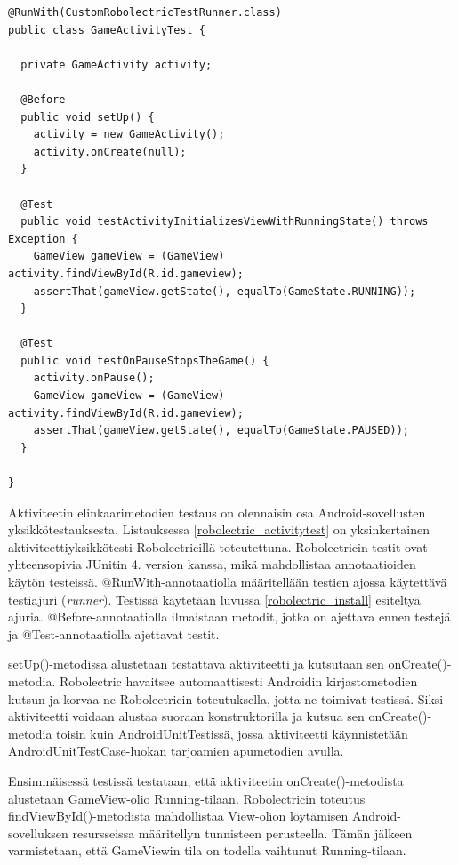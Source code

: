 \begin{lstlisting}[float,label=robolectric_activitytest,caption=Yksinkertainen aktiviteettiyksikkötesti Robolectricilla]
@RunWith(CustomRobolectricTestRunner.class)
public class GameActivityTest {

  private GameActivity activity;

  @Before
  public void setUp() {
    activity = new GameActivity();
    activity.onCreate(null);
  }

  @Test
  public void testActivityInitializesViewWithRunningState() throws Exception {
    GameView gameView = (GameView) activity.findViewById(R.id.gameview);
    assertThat(gameView.getState(), equalTo(GameState.RUNNING));
  }
  
  @Test
  public void testOnPauseStopsTheGame() {
  	activity.onPause();
  	GameView gameView = (GameView) activity.findViewById(R.id.gameview);
  	assertThat(gameView.getState(), equalTo(GameState.PAUSED));
  }
  
}
\end{lstlisting}

Aktiviteetin elinkaarimetodien testaus on olennaisin osa Android-sovellusten yksikkötestauksesta. Listauksessa \ref{robolectric_activitytest} on yksinkertainen aktiviteettiyksikkötesti Robolectricillä toteutettuna. Robolectricin testit ovat yhteensopivia JUnitin 4. version kanssa, mikä mahdollistaa annotaatioiden käytön testeissä. @RunWith-annotaatiolla määritellään testien ajossa käytettävä testiajuri (\emph{runner}). Testissä käytetään luvussa \ref{robolectric_install} esiteltyä ajuria. @Before-annotaatiolla ilmaistaan metodit, jotka on ajettava ennen testejä ja @Test-annotaatiolla ajettavat testit.

setUp()-metodissa alustetaan testattava aktiviteetti ja kutsutaan sen onCreate()-metodia. Robolectric havaitsee automaattisesti Androidin kirjastometodien kutsun ja korvaa ne Robolectricin toteutuksella, jotta ne toimivat testissä. Siksi aktiviteetti voidaan alustaa suoraan konstruktorilla ja kutsua sen onCreate()-metodia toisin kuin AndroidUnitTestissä, jossa aktiviteetti käynnistetään AndroidUnitTestCase-luokan tarjoamien apumetodien avulla.

Ensimmäisessä testissä testataan, että aktiviteetin onCreate()-metodista alustetaan GameView-olio Running-tilaan. Robolectricin toteutus findViewById()-metodista mahdollistaa View-olion löytämisen Android-sovelluksen resursseissa määritellyn tunnisteen perusteella. Tämän jälkeen varmistetaan, että GameViewin tila on todella vaihtunut Running-tilaan. 

